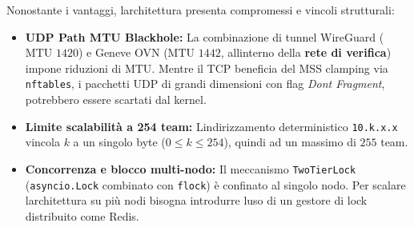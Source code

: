 Nonostante i vantaggi, l\textquotesingle architettura presenta
compromessi e vincoli strutturali:

\begin{itemize}
\tightlist
\item
  \textbf{UDP Path MTU Blackhole:} La combinazione di tunnel WireGuard
  (\(\text{MTU } 1420\)) e Geneve OVN (\(\text{MTU } 1442\),
  all\textquotesingle interno della \textbf{rete di verifica}) impone
  riduzioni di MTU. Mentre il TCP beneficia del MSS clamping via
  \passthrough{\lstinline!nftables!}, i pacchetti UDP di grandi
  dimensioni con flag \emph{Don\textquotesingle t Fragment}, potrebbero
  essere scartati dal kernel.
\item
  \textbf{Limite scalabilità a 254 team:}
  L\textquotesingle indirizzamento deterministico
  \passthrough{\lstinline!10.k.x.x!} vincola \(k\) a un singolo byte
  (\(0 \le k \le 254\)), quindi ad un massimo di \(\text{255}\) team.
\item
  \textbf{Concorrenza e blocco multi-nodo:} Il meccanismo
  \passthrough{\lstinline!TwoTierLock!}
  (\passthrough{\lstinline!asyncio.Lock!} combinato con
  \passthrough{\lstinline!flock!}) è confinato al singolo nodo. Per
  scalare l\textquotesingle architettura su più nodi bisogna introdurre
  l\textquotesingle uso di un gestore di lock distribuito come Redis.
\end{itemize}
